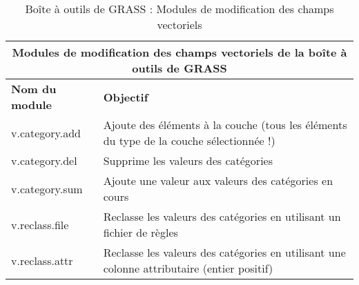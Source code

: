 \begin{table}[ht]
\centering
\caption{Bo\^ite \`a outils de GRASS : Modules de modification des champs vectoriels}\medskip
 \begin{tabular}{|p{4cm}|p{12cm}|}
  \hline \multicolumn{2}{|c|}{\textbf{Modules de modification des champs vectoriels de la bo\^ite \`a outils de GRASS}} \\
  \hline \textbf{Nom du module} & \textbf{Objectif} \\
  \hline v.category.add & Ajoute des \'el\'ements \`a la couche (tous les \'el\'ements du type de la couche s\'electionn\'ee !)\\
  \hline v.category.del & Supprime les valeurs des cat\'egories\\
  \hline v.category.sum & Ajoute une valeur aux valeurs des cat\'egories en cours\\
  \hline v.reclass.file & Reclasse les valeurs des cat\'egories en utilisant un fichier de r\`egles\\
  \hline v.reclass.attr & Reclasse les valeurs des cat\'egories en utilisant une colonne attributaire (entier positif)\\
\hline
\end{tabular}
\end{table}

